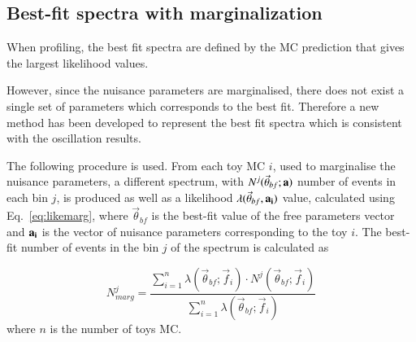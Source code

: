 
\subsection{Best-fit spectra with marginalization}
\label{sec:spectra_bestfit_method}

When profiling, the best fit spectra are defined by the MC prediction that gives the largest likelihood values.


However, since the nuisance parameters are marginalised, there does not exist a single set 
of parameters
which corresponds to the best fit. Therefore a new method has been developed to 
represent the best fit spectra which is consistent with the oscillation results. 


The following procedure is used.
From each toy MC $i$, 
used to marginalise the nuisance parameters, 
a different spectrum,
with $N^{j}(\vec{\theta}_{bf}; \bf{a})$ number of events in each bin $j$, 
is produced
as well as a likelihood $\lambda (\vec{\theta}_{bf},\bf{a_i}) $ value, 
calculated using Eq.~\ref{eq:likemarg},
where 
$\vec{\theta}_{bf}$ is the best-fit value of the free parameters vector
and 
$\bf{a_i}$
is the vector of nuisance parameters corresponding to the toy $i$.
The best-fit number of events in the bin $j$ of the spectrum is calculated as

\begin{equation} \label{eq:bestfit_spectrum_marg}
N^j_{marg} = \frac{ \sum_{i=1}^{n} \lambda (\vec{\theta}_{bf}; \vec{f}_i) \cdot N^{j}(\vec{\theta}_{bf}; \vec{f}_i) }{ \sum_{i=1}^{n} \lambda (\vec{\theta}_{bf}; \vec{f}_i)  }
\end{equation}
where $n$ is the number of toys MC.

